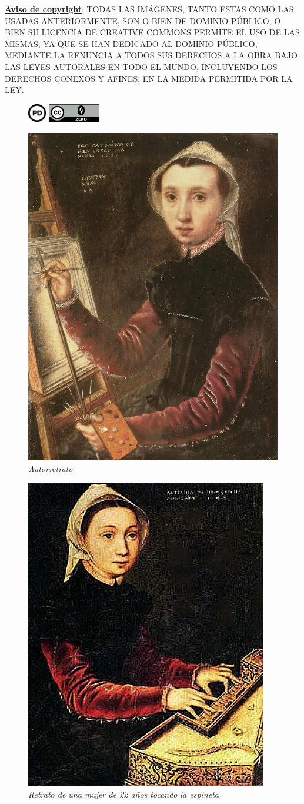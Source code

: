 \documentclass[12pt]{report}
\begin{document}
\underline{\textbf{Aviso de copyright}}: TODAS LAS IMÁGENES, TANTO ESTAS COMO LAS USADAS ANTERIORMENTE, SON O BIEN DE DOMINIO PÚBLICO, O BIEN SU LICENCIA DE CREATIVE COMMONS PERMITE EL USO DE LAS MISMAS, YA QUE SE HAN DEDICADO AL DOMINIO PÚBLICO, MEDIANTE LA RENUNCIA A TODOS SUS DERECHOS A LA OBRA BAJO LAS LEYES AUTORALES EN TODO EL MUNDO, INCLUYENDO LOS DERECHOS CONEXOS Y AFINES, EN LA MEDIDA PERMITIDA POR LA LEY.
\begin{figure}[h]
	\centering
	\begin{minipage}{.5\textwidth}
		\centering
		\includegraphics[height=0.8cm]{public-domain}
	\end{minipage}%
	\begin{minipage}{.5\textwidth}
		\centering
		\includegraphics[height=0.8cm]{cc0}
	\end{minipage}
\end{figure}

\begin{figure}[h]
	\centering
	\includegraphics[width=0.3\linewidth]{self-portrait}
	\caption{\textit{Autorretrato}}
	\label{fig:wrapfig}
\end{figure}

\begin{figure}[h]
	\centering
	\includegraphics[width=0.4\linewidth]{portrait-of-a-22-year-old-woman-playing-the-spinet}
	\caption{\textit{Retrato de una mujer de 22 años tocando la espineta}}
\end{figure}
\end{document}
